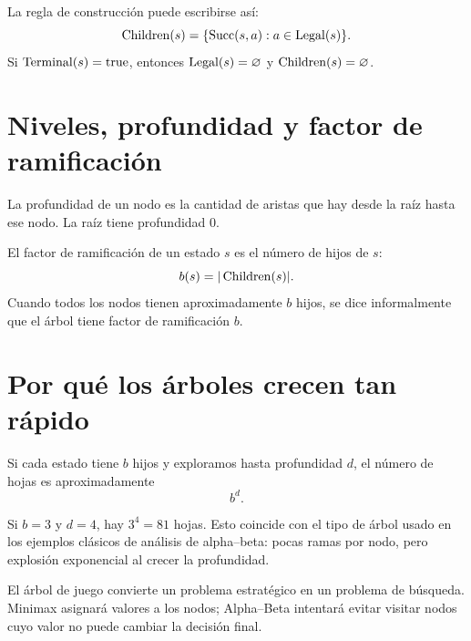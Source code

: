 \begin{formalbox}
La regla de construcción puede escribirse así:
\[
\operatorname{Children}(s)=\{\operatorname{Succ}(s,a):a\in\operatorname{Legal}(s)\}.
\]
Si $\operatorname{Terminal}(s)=\mathrm{true}$, entonces $\operatorname{Legal}(s)=\varnothing$ y $\operatorname{Children}(s)=\varnothing$.
\end{formalbox}

\section{Niveles, profundidad y factor de ramificación}

\begin{definition}[Profundidad]
La profundidad de un nodo es la cantidad de aristas que hay desde la raíz hasta ese nodo. La raíz tiene profundidad $0$.
\end{definition}

\begin{definition}
El factor de ramificación de un estado $s$ es el número de hijos de $s$:
\[
 b(s)=|\operatorname{Children}(s)|.
\]
Cuando todos los nodos tienen aproximadamente $b$ hijos, se dice informalmente que el árbol tiene factor de ramificación $b$.
\end{definition}

\section{Por qué los árboles crecen tan rápido}

Si cada estado tiene $b$ hijos y exploramos hasta profundidad $d$, el número de hojas es aproximadamente
\[
 b^d.
\]

\begin{example}[Crecimiento con $b=3$]
Si $b=3$ y $d=4$, hay $3^4=81$ hojas. Esto coincide con el tipo de árbol usado en los ejemplos clásicos de análisis de alpha--beta: pocas ramas por nodo, pero explosión exponencial al crecer la profundidad.
\end{example}

\begin{summarybox}
El árbol de juego convierte un problema estratégico en un problema de búsqueda. Minimax asignará valores a los nodos; Alpha--Beta intentará evitar visitar nodos cuyo valor no puede cambiar la decisión final.
\end{summarybox}
